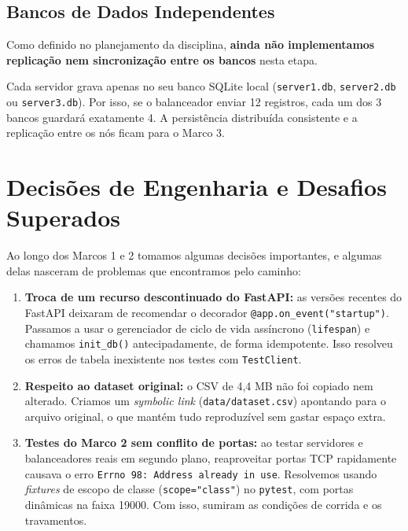 \documentclass[12pt,a4paper]{article}
\begin{document}
	\subsection{Bancos de Dados Independentes}
	Como definido no planejamento da disciplina, \textbf{ainda não implementamos replicação nem sincronização entre os bancos} nesta etapa.
	
	Cada servidor grava apenas no seu banco SQLite local (\texttt{server1.db}, \texttt{server2.db} ou \texttt{server3.db}). Por isso, se o balanceador enviar 12 registros, cada um dos 3 bancos guardará exatamente 4. A persistência distribuída consistente e a replicação entre os nós ficam para o Marco 3.
	
	\section{Decisões de Engenharia e Desafios Superados}
	
	Ao longo dos Marcos 1 e 2 tomamos algumas decisões importantes, e algumas delas nasceram de problemas que encontramos pelo caminho:
	
	\begin{enumerate}
		\item \textbf{Troca de um recurso descontinuado do FastAPI:} as versões recentes do FastAPI deixaram de recomendar o decorador \texttt{@app.on\_event("startup")}. Passamos a usar o gerenciador de ciclo de vida assíncrono (\texttt{lifespan}) e chamamos \texttt{init\_db()} antecipadamente, de forma idempotente. Isso resolveu os erros de tabela inexistente nos testes com \texttt{TestClient}.
		\item \textbf{Respeito ao dataset original:} o CSV de 4,4 MB não foi copiado nem alterado. Criamos um \textit{symbolic link} (\texttt{data/dataset.csv}) apontando para o arquivo original, o que mantém tudo reproduzível sem gastar espaço extra.
		\item \textbf{Testes do Marco 2 sem conflito de portas:} ao testar servidores e balanceadores reais em segundo plano, reaproveitar portas TCP rapidamente causava o erro \texttt{Errno 98: Address already in use}. Resolvemos usando \textit{fixtures} de escopo de classe (\texttt{scope="class"}) no \texttt{pytest}, com portas dinâmicas na faixa 19000. Com isso, sumiram as condições de corrida e os travamentos.
	\end{enumerate}
	
\end{document}
